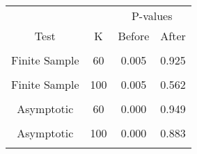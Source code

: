 \begin{table}[!h]
\centering
\begin{tabular}{cccc}
\toprule
\multicolumn{1}{c}{ } & \multicolumn{1}{c}{ } & \multicolumn{2}{c}{P-values} \\
\cmidrule(l{3pt}r{3pt}){3-4}
Test & K & Before & After\\
\midrule
\cellcolor{gray!6}{Finite Sample} & \cellcolor{gray!6}{40} & \cellcolor{gray!6}{0.005} & \cellcolor{gray!6}{0.602}\\
Finite Sample & 60 & 0.005 & 0.925\\
\cellcolor{gray!6}{Finite Sample} & \cellcolor{gray!6}{80} & \cellcolor{gray!6}{0.005} & \cellcolor{gray!6}{0.542}\\
Finite Sample & 100 & 0.005 & 0.562\\
\cellcolor{gray!6}{Asymptotic} & \cellcolor{gray!6}{40} & \cellcolor{gray!6}{0.000} & \cellcolor{gray!6}{0.973}\\
\addlinespace
Asymptotic & 60 & 0.000 & 0.949\\
\cellcolor{gray!6}{Asymptotic} & \cellcolor{gray!6}{80} & \cellcolor{gray!6}{0.000} & \cellcolor{gray!6}{0.981}\\
Asymptotic & 100 & 0.000 & 0.883\\
\cellcolor{gray!6}{ECE} & \cellcolor{gray!6}{} & \cellcolor{gray!6}{0.236} & \cellcolor{gray!6}{0.119}\\
\bottomrule
\end{tabular}
\end{table}
